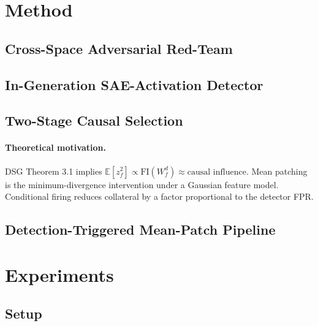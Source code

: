 \documentclass{article}
\begin{document}
\section{Method}
\label{sec:method}

\subsection{Cross-Space Adversarial Red-Team}
\label{sec:method:redteam}

\subsection{In-Generation SAE-Activation Detector}
\label{sec:method:detector}

\subsection{Two-Stage Causal Selection}
\label{sec:method:twostage}
\paragraph{Theoretical motivation.} %
DSG Theorem 3.1 implies $\mathbb{E}[z_f^2] \propto \text{FI}(W^d_f) \approx \text{causal influence}$.
Mean patching is the minimum-divergence intervention under a Gaussian feature model.
Conditional firing reduces collateral by a factor proportional to the detector FPR.

\subsection{Detection-Triggered Mean-Patch Pipeline}
\label{sec:method:pipeline}

\section{Experiments}
\label{sec:exp}

\subsection{Setup}
\end{document}
